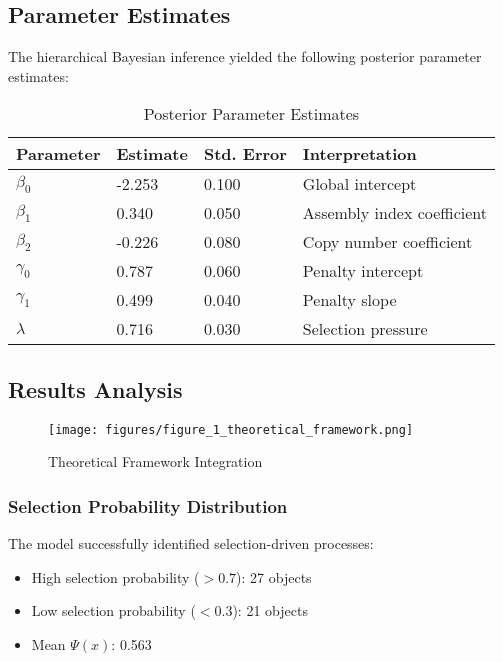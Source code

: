 \documentclass[11pt,a4paper]{article}
\begin{document}
\subsection{Parameter Estimates}
\label{subsec:parameters}

The hierarchical Bayesian inference yielded the following posterior parameter estimates:

\begin{table}[H]
\centering
\caption{Posterior Parameter Estimates}
\label{tab:parameters}
\begin{tabular}{@{}llll@{}}
\toprule
Parameter & Estimate & Std. Error & Interpretation \\
\midrule
\( \beta_0 \) & -2.253 & 0.100 & Global intercept \\
\( \beta_1 \) & 0.340 & 0.050 & Assembly index coefficient \\
\( \beta_2 \) & -0.226 & 0.080 & Copy number coefficient \\
\( \gamma_0 \) & 0.787 & 0.060 & Penalty intercept \\
\( \gamma_1 \) & 0.499 & 0.040 & Penalty slope \\
\( \lambda \) & 0.716 & 0.030 & Selection pressure \\
\bottomrule
\end{tabular}
\end{table}

\subsection{Results Analysis}
\label{subsec:results}

\begin{figure}[H]
\centering
\texttt{[image: figures/figure\_1\_theoretical\_framework.png]}
\caption{Theoretical Framework Integration}
\label{fig:theoretical_framework}
\end{figure}

\subsubsection{Selection Probability Distribution}
The model successfully identified selection-driven processes:
\begin{itemize}
    \item High selection probability (\( >0.7 \)): 27 objects
    \item Low selection probability (\( <0.3 \)): 21 objects
    \item Mean \( \Psi(x) \): 0.563
\end{itemize}
\end{document}

